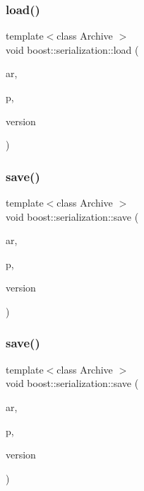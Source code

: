 \mbox{\label{namespaceboost_1_1serialization_ac8d644880f4596e04671aa5db78527ff}} 
\subsubsection{\texorpdfstring{load()}{load()}\hspace{0.1cm}{\footnotesize\ttfamily [6/6]}}
{\footnotesize\ttfamily template$<$class Archive $>$ \\
void boost\+::serialization\+::load (\begin{DoxyParamCaption}\item[{Archive \&}]{ar,  }\item[{Crypto\+P\+P\+::\+Sec\+Byte\+Block \&}]{p,  }\item[{const unsigned int}]{version }\end{DoxyParamCaption})}

\mbox{\label{namespaceboost_1_1serialization_a7c8cd6b4a705476128a04299a9d0ab02}} 
\subsubsection{\texorpdfstring{save()}{save()}\hspace{0.1cm}{\footnotesize\ttfamily [1/6]}}
{\footnotesize\ttfamily template$<$class Archive $>$ \\
void boost\+::serialization\+::save (\begin{DoxyParamCaption}\item[{Archive \&}]{ar,  }\item[{const N\+T\+L\+::\+ZZ \&}]{p,  }\item[{const unsigned int}]{version }\end{DoxyParamCaption})}

\mbox{\label{namespaceboost_1_1serialization_a9d93508b5efacb662d1ab755d3d9b828}} 
\subsubsection{\texorpdfstring{save()}{save()}\hspace{0.1cm}{\footnotesize\ttfamily [2/6]}}
{\footnotesize\ttfamily template$<$class Archive $>$ \\
void boost\+::serialization\+::save (\begin{DoxyParamCaption}\item[{Archive \&}]{ar,  }\item[{const N\+T\+L\+::\+Z\+Z\+\_\+p \&}]{p,  }\item[{const unsigned int}]{version }\end{DoxyParamCaption})}

